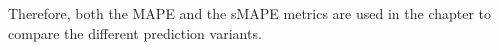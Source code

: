       Therefore, both the MAPE and the sMAPE metrics are used in the  chapter to compare the different prediction variants.





    







